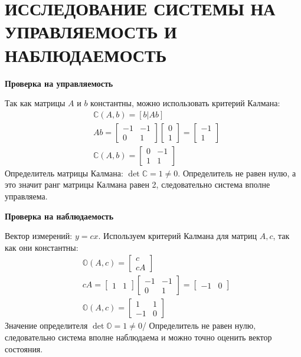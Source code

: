 \chapter{\MakeUppercase{ Исследование системы на управляемость и наблюдаемость }}
\textbf{Проверка на управляемость}

Так как матрицы $ A $ и $ b $ константны, можно использовать критерий Калмана:
\begin{align*}
    &\mathbb{C} (A, b) = [b | Ab] \\
    &Ab =\begin{bmatrix}
        -1 & -1 \\ 0 & 1
    \end{bmatrix} \begin{bmatrix}
        0 \\ 1
    \end{bmatrix} = \begin{bmatrix}
        -1 \\ 1
    \end{bmatrix} \\
    &\mathbb{C} (A, b) = \begin{bmatrix}
        0 & -1 \\ 1 & 1
    \end{bmatrix}
\end{align*}
\noindent Определитель матрицы Калмана: $ \det\mathbb{C} = 1 \neq 0 $. Определитель не равен нулю, а это значит ранг матрицы Калмана равен 2, следовательно система вполне управляема.

\textbf{Проверка на наблюдаемость}

Вектор измерений: $ y=cx $. Используем критерий Калмана для матриц $ A, c $, так как они константны:
\begin{align*}
    & \mathbb{O}(A, c) = \begin{bmatrix}
        c \\ cA
    \end{bmatrix} \\
    & cA = \begin{bmatrix}
        1 & 1
    \end{bmatrix} \begin{bmatrix}
        -1 & -1 \\ 0 & 1
    \end{bmatrix} = \begin{bmatrix}
        -1 & 0
    \end{bmatrix} \\
    & \mathbb{O}(A, c) = \begin{bmatrix}
        1 & 1 \\
        -1 & 0
    \end{bmatrix}
\end{align*}
\noindent Значение определителя $ \det\mathbb{O} = 1 \neq 0 $/ Определитель не равен нулю, следовательно система вполне наблюдаема и можно точно оценить вектор состояния. 
